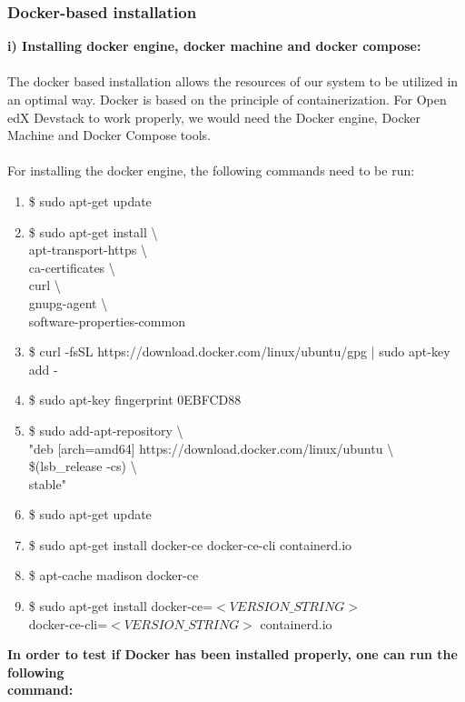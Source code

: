 \documentclass[12pt]{report}
\begin{document}
\subsubsection{Docker-based installation}
\label{sec:dockerinstall}
\textbf{i) Installing docker engine, docker machine and docker compose:}
\\ \\
The docker based installation allows the resources of our system to be utilized in an optimal way. Docker is based on the principle of containerization. For Open edX Devstack to work properly, we would need the Docker engine, Docker Machine and Docker Compose tools.\\ \\
For installing the docker engine, the following commands need to be run:
\begin{enumerate}
	\item \$ sudo apt-get update
	\item \$ sudo apt-get install \textbackslash \\
	apt-transport-https \textbackslash \\
	ca-certificates \textbackslash \\
	curl \textbackslash \\
	gnupg-agent \textbackslash \\
	software-properties-common
	\item \$ curl -fsSL https://download.docker.com/linux/ubuntu/gpg | sudo apt-key add -
	\item \$ sudo apt-key fingerprint 0EBFCD88
	\item \$ sudo add-apt-repository \textbackslash \\
	"deb [arch=amd64] https://download.docker.com/linux/ubuntu \textbackslash \\
	\$(lsb\_release -cs) \textbackslash \\
	stable"
	\item \$ sudo apt-get update
	\item \$ sudo apt-get install docker-ce docker-ce-cli containerd.io
	\item \$ apt-cache madison docker-ce
	\item \$ sudo apt-get install docker-ce=$<VERSION\_STRING>$\\docker-ce-cli=$<VERSION\_STRING>$ containerd.io
\end{enumerate}
\textbf{In order to test if Docker has been installed properly, one can run the following \\command:\\}
\end{document}
